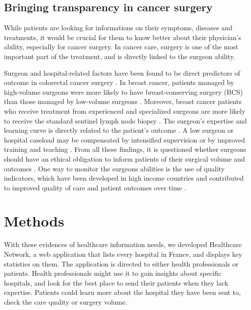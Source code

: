 \subsection{Bringing transparency in cancer surgery}

While patients are looking for informations on their symptoms, diseases and treatments, it would be crucial for them to know better about their physician's ability, especially for cancer surgery. In cancer care, surgery is one of the most important part of the treatment, and is directly linked to the surgeon ability.

Surgeon and hospital-related factors have been found to be direct predictors of outcome in colorectal cancer surgery \cite{renzulli_influence_2006, bonati_surgeon_2021}. In breast cancer, patients managed by high-volume surgeons were more likely to have breast-conserving surgery (BCS) than those managed by low-volume surgeons \cite{mcdermott_surgeon_2013}. Moreover, breast cancer patients who receive treatment from experienced and specialized surgeons are more likely to receive the standard sentinel lymph node biopsy \cite{yen_surgeon_2014}. The surgeon's expertise and learning curve is directly related to the patient's outcome \cite{renzulli_learning_2005}. A low surgeon or hospital caseload may be compensated by intensified supervision or by improved training and teaching \cite{bonati_surgeon_2021}. From all these findings, it is questioned whether surgeons should have an ethical obligation to inform patients of their surgical volume and outcomes \cite{glaser_surgeon_2019}. One way to monitor the surgeons abilities is the use of quality indicators, which have been developed in high income countries and contributed to improved quality of care and patient outcomes over time \cite{nietz_quality_2020}.

\section{Methods}

With these evidences of healthcare information needs, we developed Healthcare Network, a web application that lists every hospital in France, and displays key statistics on them. The application is directed to either health professionals or patients. Health professionals might use it to gain insights about specific hospitals, and look for the best place to send their patients when they lack expertise. Patients could learn more about the hospital they have been sent to, check the care quality or surgery volume.

